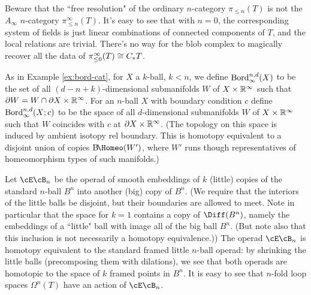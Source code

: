 Beware that the ``free resolution" of the ordinary $n$-category $\pi_{\leq n}(T)$ 
is not the $A_\infty$ $n$-category $\pi^\infty_{\leq n}(T)$.
It's easy to see that with $n=0$, the corresponding system of fields is just 
linear combinations of connected components of $T$, and the local relations are trivial.
There's no way for the blob complex to magically recover all the data of $\pi^\infty_{\leq 0}(T) \cong C_* T$.

\begin{example}
\rm
\label{ex:bordism-category-ainf}
As in Example \ref{ex:bord-cat}, for $X$ a $k$-ball, $k<n$, we define $\operatorname{Bord}^{n,d}_\infty(X)$
to be the set of all $(d{-}n{+}k)$-dimensional
submanifolds $W$ of $X\times \mathbb R^\infty$ such that $\partial W = W \cap \partial X \times \mathbb R^\infty$.
For an $n$-ball $X$ with boundary condition $c$ 
define $\operatorname{Bord}^{n,d}_\infty(X; c)$ to be the space of all $d$-dimensional
submanifolds $W$ of $X\times \mathbb R^\infty$ such that 
$W$ coincides with $c$ at $\partial X \times \mathbb R^\infty$.
(The topology on this space is induced by ambient isotopy rel boundary.
This is homotopy equivalent to a disjoint union of copies $\mathrm{B}\!\Homeo(W')$, where
$W'$ runs though representatives of homeomorphism types of such manifolds.)
\end{example}



Let $\cE\cB_n$ be the operad of smooth embeddings of $k$ (little)
copies of the standard $n$-ball $B^n$ into another (big) copy of $B^n$.
(We require that the interiors of the little balls be disjoint, but their 
boundaries are allowed to meet.
Note in particular that the space for $k=1$ contains a copy of $\Diff(B^n)$, namely
the embeddings of a ``little" ball with image all of the big ball $B^n$.
(But note also that this inclusion is not
necessarily a homotopy equivalence.))
The operad $\cE\cB_n$ is homotopy equivalent to the standard framed little $n$-ball operad:
by shrinking the little balls (precomposing them with dilations), 
we see that both operads are homotopic to the space of $k$ framed points
in $B^n$.
It is easy to see that $n$-fold loop spaces $\Omega^n(T)$  have
an action of $\cE\cB_n$.

